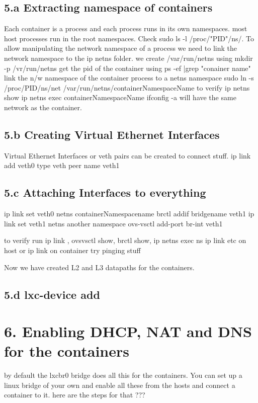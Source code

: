 \documentclass{report}
\begin{document}
\subsection*{5.a Extracting namespace of containers}
		Each container is a process and each process runs in its own namespaces. most host processes run in the root namespaces. Check sudo ls -l /proc/"PID"/ns/. To allow manipulating the network namespace of a process we need to link the network namespace to the ip netns folder. we create /var/run/netns using mkdir -p /vr/run/netns
	get the pid of the container using ps -ef |grep "conainer name"
	link the n/w namespace of the container process to a netns namespace sudo ln -s /proc/PID/ns/net /var/run/netns/containerNamespaceName
	to verify ip netns show
	ip netns exec containerNamespaceName ifconfig -a will have the same network as the container.

\subsection*{5.b Creating Virtual Ethernet Interfaces}
		Virtual Ethernet Interfaces or veth pairs can be created to connect stuff. ip link add veth0 type veth peer name veth1

\subsection*{5.c Attaching Interfaces to everything}
		ip link set veth0 netns containerNamespacename
		brctl addif bridgename veth1
		ip link set veth1 netns another namespace
		ovs-vsctl add-port br-int veth1
		
		to verify run ip link , ovsvsctl show, brctl show, ip netns exec ns ip link etc on host
		or ip link on container
		try pinging stuff

		Now we have created L2 and L3 datapaths for the containers.

\subsection*{5.d lxc-device add}

\section*{6. Enabling DHCP, NAT and DNS for the containers}

		by default the lxcbr0 bridge does all this for the containers. You can set up a linux bridge of your own and enable all these from the hosts and connect a container to it. here are the steps for that ???
\end{document}
